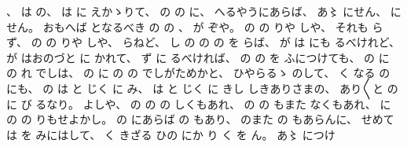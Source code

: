 、
%
は
の、
%
は
に
えかゝりて、
%
の
の
に、
%
へるやうにあらば、
%
あ〻
にせん、
%
にせん。
%
おもへば
となるべき
の
の
、
%
が
ぞや。
%
の
の
りや
しや、
%
それも
らず、
%
の
の
りや
しや、
%
らねど、
%
し
の
の
の
を
らば、
%
が
は
にも
るべけれど、
%
が
はおのづと
に
かれて、
%
ず
に
るべければ、
%
の
の
を
ふにつけても、
%
の
に
の
れ
でしは、
%
の
に
の
の
でしがためかと、
%
ひやらるゝ
のして、
%
く
なる
の
にも、
%
の
は
と
じく
に
み、
%
は
と
じく
に
きし
しきありさまの、
%
あり〳〵と
の
に
び
るなり。
%
よしや、
%
の
の
の
しくもあれ、
%
の
の
もまた
なくもあれ、
%
に
の
の
りもせよかし。
%
の
にあらば
の
もあり、
%
のまた
の
もあらんに、
%
せめては
を
みにはして、
%
く
きざる
ひの
にか
り
く
を
ん。
%
あ〻
につけ
